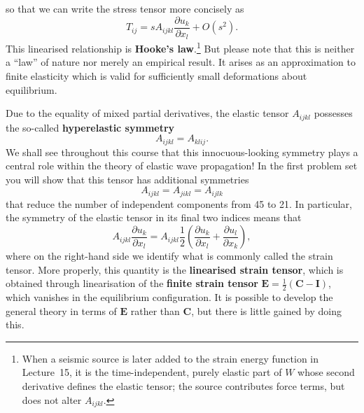 so that we can write the stress tensor more concisely as
\begin{equation}
T_{ij} = s A_{ijkl}\frac{\partial u_{k}}{\partial x_{l}} + O(s^2).
\label{eq:30}
\end{equation}
This linearised relationship is \textbf{Hooke's law}.\footnote{When a seismic source is later added to the strain energy function 
in Lecture~15, it is the time-independent, purely elastic part of $W$ whose second derivative defines the elastic tensor; the 
source contributes force terms, but does not alter $A_{ijkl}$.} But please note that this is neither a ``law'' of nature nor merely an
empirical result. It arises as an approximation to finite elasticity which is valid for sufficiently small 
deformations about equilibrium.

Due to the equality of mixed partial derivatives, the elastic tensor $A_{ijkl}$ 
possesses the so-called \textbf{hyperelastic symmetry}
\begin{equation}
A_{ijkl} = A_{klij}.
\label{eq:31}
\end{equation}
We shall see throughout this course that this innocuous-looking symmetry plays a central role within the theory of elastic wave propagation!
 In the first problem set you will show that this tensor has additional symmetries
\begin{equation}
A_{ijkl} = A_{jikl} = A_{ijlk}
\label{eq:32}
\end{equation}
that reduce the number of independent components from 45 to 21. In particular, the symmetry of the elastic tensor in its
final two indices means that
\begin{equation}
A_{ijkl}\frac{\partial u_{k}}{\partial x_{l}} = A_{ijkl}\frac{1}{2}\left(\frac{\partial u_{k}}{\partial x_{l}} + 
\frac{\partial u_{l}}{\partial x_{k}}\right),
\label{eq:33}
\end{equation}
where on the right-hand side we identify what is commonly called the strain tensor. More properly, this quantity is the 
\textbf{linearised strain tensor}, which is obtained through linearisation of the \textbf{finite strain tensor} $\mathbf{E} = \frac{1}{2}(\mathbf{C} - 
\mathbf{I})$, which vanishes in the equilibrium configuration. It is possible to develop the general theory 
in terms of $\mathbf{E}$ rather than $\mathbf{C}$, but there is little gained by doing this.


